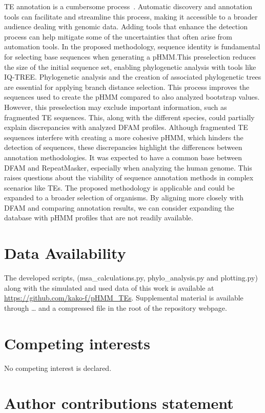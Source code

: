 \documentclass[unnumsec,webpdf,contemporary,large]{oup-authoring-template}%
\theoremstyle{thmstyleone}%
\theoremstyle{thmstyletwo}%
\theoremstyle{thmstylethree}%
\begin{document}
TE annotation is a cumbersome process~\cite{ou_benchmarking_2019,
branco_overview_2023}. Automatic discovery and annotation tools can facilitate
and streamline this process, making it accessible to a broader audience dealing
with genomic data. Adding tools that enhance the detection process can help
mitigate some of the uncertainties that often arise from automation tools. In
the proposed methodology, sequence identity is fundamental for selecting base
sequences when generating a pHMM.\@ This preselection reduces the size of the
initial sequence set, enabling phylogenetic analysis with tools like IQ-TREE.\@
Phylogenetic analysis and the creation of associated phylogenetic trees are
essential for applying branch distance selection. This process improves the
sequences used to create the pHMM compared to also analyzed bootstrap values.
However, this preselection may exclude important information, such as fragmented
TE sequences. This, along with the different species, could partially explain
discrepancies with analyzed DFAM profiles. Although fragmented TE sequences
interfere with creating a more cohesive pHMM, which hinders the detection of
sequences, these discrepancies highlight the differences between annotation
methodologies. It was expected to have a common base between DFAM and
RepeatMasker, especially when analyzing the human genome. This raises questions
about the viability of sequence annotation methods in complex scenarios like
TEs. The proposed methodology is applicable and could be expanded to a broader
selection of organisms. By aligning more closely with DFAM and comparing
annotation results, we can consider expanding the database with pHMM profiles
that are not readily available.

\section{Data Availability}
The developed scripts, (msa\_calculations.py, phylo\_analysis.py and
plotting.py) along with the simulated and used data of this work is available at
\url{https://github.com/kako-f/pHMM_TEs}. Supplemental material is available
through … and a compressed file in the root of the repository webpage.

\section{Competing interests}
No competing interest is declared.

\section{Author contributions statement}
\end{document}
